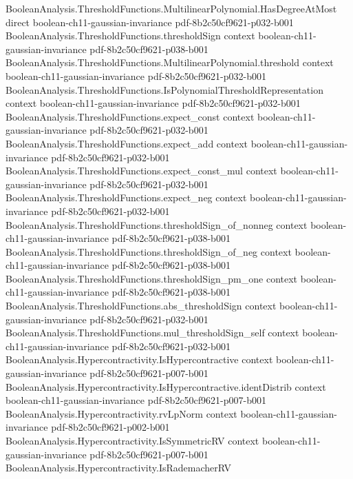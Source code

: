 \begin{theorem}
  {BooleanAnalysis.ThresholdFunctions.MultilinearPolynomial.HasDegreeAtMost}
  {direct}
  {boolean-ch11-gaussian-invariance}
  {pdf-8b2c50cf9621-p032-b001}
\proofstep
  {BooleanAnalysis.ThresholdFunctions.thresholdSign}
  {context}
  {boolean-ch11-gaussian-invariance}
  {pdf-8b2c50cf9621-p038-b001}
\proofstep
  {BooleanAnalysis.ThresholdFunctions.MultilinearPolynomial.threshold}
  {context}
  {boolean-ch11-gaussian-invariance}
  {pdf-8b2c50cf9621-p032-b001}
\proofstep
  {BooleanAnalysis.ThresholdFunctions.IsPolynomialThresholdRepresentation}
  {context}
  {boolean-ch11-gaussian-invariance}
  {pdf-8b2c50cf9621-p032-b001}
\proofstep
  {BooleanAnalysis.ThresholdFunctions.expect_const}
  {context}
  {boolean-ch11-gaussian-invariance}
  {pdf-8b2c50cf9621-p032-b001}
\proofstep
  {BooleanAnalysis.ThresholdFunctions.expect_add}
  {context}
  {boolean-ch11-gaussian-invariance}
  {pdf-8b2c50cf9621-p032-b001}
\proofstep
  {BooleanAnalysis.ThresholdFunctions.expect_const_mul}
  {context}
  {boolean-ch11-gaussian-invariance}
  {pdf-8b2c50cf9621-p032-b001}
\proofstep
  {BooleanAnalysis.ThresholdFunctions.expect_neg}
  {context}
  {boolean-ch11-gaussian-invariance}
  {pdf-8b2c50cf9621-p032-b001}
\proofstep
  {BooleanAnalysis.ThresholdFunctions.thresholdSign_of_nonneg}
  {context}
  {boolean-ch11-gaussian-invariance}
  {pdf-8b2c50cf9621-p038-b001}
\proofstep
  {BooleanAnalysis.ThresholdFunctions.thresholdSign_of_neg}
  {context}
  {boolean-ch11-gaussian-invariance}
  {pdf-8b2c50cf9621-p038-b001}
\proofstep
  {BooleanAnalysis.ThresholdFunctions.thresholdSign_pm_one}
  {context}
  {boolean-ch11-gaussian-invariance}
  {pdf-8b2c50cf9621-p038-b001}
\proofstep
  {BooleanAnalysis.ThresholdFunctions.abs_thresholdSign}
  {context}
  {boolean-ch11-gaussian-invariance}
  {pdf-8b2c50cf9621-p032-b001}
\proofstep
  {BooleanAnalysis.ThresholdFunctions.mul_thresholdSign_self}
  {context}
  {boolean-ch11-gaussian-invariance}
  {pdf-8b2c50cf9621-p032-b001}
\proofstep
  {BooleanAnalysis.Hypercontractivity.IsHypercontractive}
  {context}
  {boolean-ch11-gaussian-invariance}
  {pdf-8b2c50cf9621-p007-b001}
\proofstep
  {BooleanAnalysis.Hypercontractivity.IsHypercontractive.identDistrib}
  {context}
  {boolean-ch11-gaussian-invariance}
  {pdf-8b2c50cf9621-p007-b001}
\proofstep
  {BooleanAnalysis.Hypercontractivity.rvLpNorm}
  {context}
  {boolean-ch11-gaussian-invariance}
  {pdf-8b2c50cf9621-p002-b001}
\proofstep
  {BooleanAnalysis.Hypercontractivity.IsSymmetricRV}
  {context}
  {boolean-ch11-gaussian-invariance}
  {pdf-8b2c50cf9621-p007-b001}
\proofstep
  {BooleanAnalysis.Hypercontractivity.IsRademacherRV}

\end{theorem}
